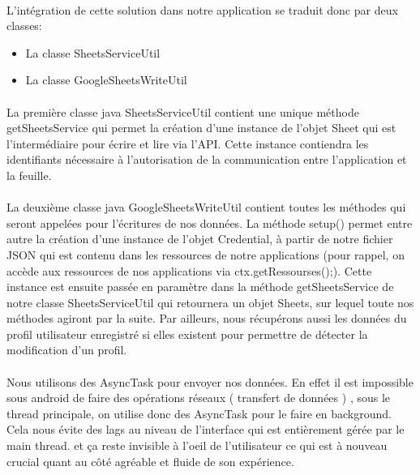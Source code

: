 \documentclass[../main.tex]{subfiles}
\begin{document}
\paragraph{}
L’intégration de cette solution dans notre application se traduit donc par deux classes:
 \begin{itemize}
\item La classe SheetsServiceUtil
\item La classe GoogleSheetsWriteUtil
\end{itemize}
\paragraph{}
La première classe java SheetsServiceUtil contient une unique méthode getSheetsService qui permet la création d’une instance de l’objet Sheet qui est l'intermédiaire pour écrire et lire via l’API. Cette instance contiendra les identifiants nécessaire à l’autorisation de la communication entre l’application et la feuille.
\paragraph{}
La deuxième classe java GoogleSheetsWriteUtil contient toutes les méthodes qui seront appelées pour l’écritures de nos données. 
La méthode setup() permet entre autre la création d’une instance de l’objet Credential, à partir de notre fichier JSON qui est contenu dans les ressources de notre applications (pour rappel, on accède aux ressources de nos applications via ctx.getRessourses();). Cette instance est ensuite passée en paramètre dans la méthode getSheetsService de notre classe SheetsServiceUtil qui retournera un objet Sheets, sur lequel toute nos méthodes agiront par la suite.
Par ailleurs, nous récupérons aussi les données du profil utilisateur enregistré si elles existent pour permettre de détecter la modification d’un profil.
\paragraph{}
Nous utilisons des AsyncTask pour envoyer nos données. En effet il est impossible sous android de faire des opérations réseaux ( transfert de données ) , sous le thread principale, on utilise donc des AsyncTask pour le faire en background. Cela nous évite des lags au niveau de l’interface qui est entièrement gérée par le main thread.
et ça reste invisible à l’oeil de l’utilisateur ce qui est à nouveau crucial quant au côté agréable et fluide de son expérience.
\end{document}
